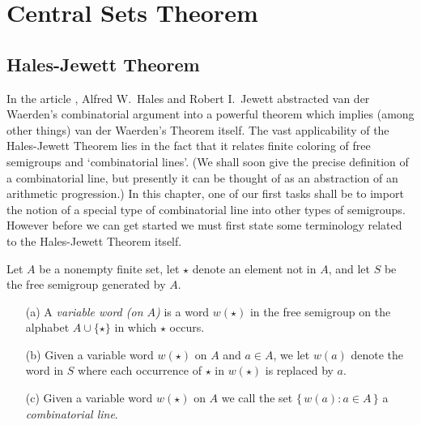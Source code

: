%

\chapter{Central Sets Theorem}

\section{Hales-Jewett Theorem}
In the article \cite{Hales:1963fk}, Alfred W.~Hales and Robert I.~Jewett abstracted van der Waerden's combinatorial argument into a powerful theorem which implies (among other things) van der Waerden's Theorem itself. 
The vast applicability of the Hales-Jewett Theorem lies in the fact that it relates finite coloring of free semigroups and `combinatorial lines'. 
(We shall soon give the precise definition of a combinatorial line, but presently it can be thought of as an abstraction of an arithmetic progression.)
In this chapter, one of our first tasks shall be to import the notion of a special type of combinatorial line into other types of semigroups. 
However before we can get started we must first state some terminology related to the Hales-Jewett Theorem itself.

\begin{defn}
  Let $A$ be a nonempty finite set, let $\star$ denote an element not in $A$, and let $S$ be the free semigroup generated by $A$.
  \begin{itemize}
    \item[(a)] 
      A \emph{variable word (on $A$)} is a word $w(\star)$ in the free semigroup on the alphabet $A \cup \{\star\}$ in which $\star$ occurs.

    \item[(b)] 
      Given a variable word $w(\star)$ on $A$ and $a \in A$, we let $w(a)$ denote the word in $S$ where each occurrence of $\star$ in $w(\star)$ is replaced by $a$.

    \item[(c)] 
      Given a variable word $w(\star)$ on $A$ we call the set $\{\, w(a) : a \in A \,\}$ a \emph{combinatorial line}.
  \end{itemize}
\end{defn}

